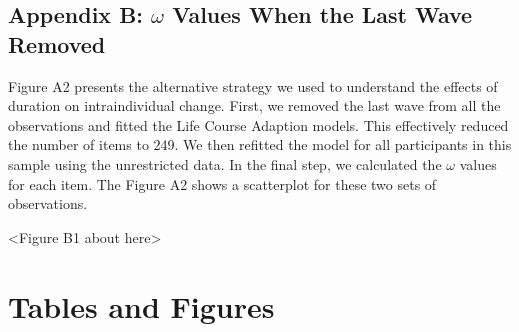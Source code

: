 \documentclass[
  12pt,
]{article}
\begin{document}
\hypertarget{appendix-b-omega-values-when-the-last-wave-removed}{%
\subsection{\texorpdfstring{Appendix B: \(\omega\) Values When the Last
Wave
Removed}{Appendix B: \textbackslash omega Values When the Last Wave Removed}}\label{appendix-b-omega-values-when-the-last-wave-removed}}

Figure A2 presents the alternative strategy we used to understand the
effects of duration on intraindividual change. First, we removed the
last wave from all the observations and fitted the Life Course Adaption
models. This effectively reduced the number of items to 249. We then
refitted the model for all participants in this sample using the
unrestricted data. In the final step, we calculated the \(\omega\)
values for each item. The Figure A2 shows a scatterplot for these two
sets of observations.

\begin{center}
<Figure B1 about here>
\end{center}

\newpage

\hypertarget{tables-and-figures}{%
\section{Tables and Figures}\label{tables-and-figures}}

\begin{table}[H]
\centering
\caption{\label{tab:unnamed-chunk-1}The Description of the Data Sources}
\centering
{}
\end{table}
\end{document}
